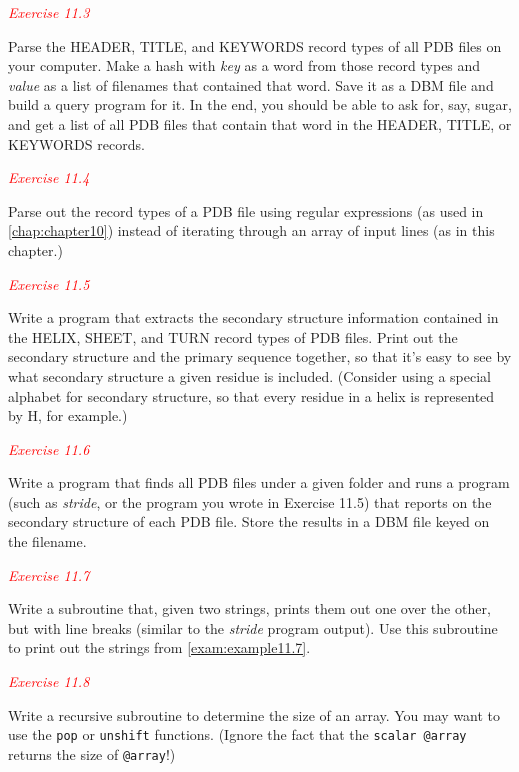 \textcolor{red}{\textit{Exercise 11.3}}
\begin{adjustwidth}{1cm}{}
Parse the HEADER, TITLE, and KEYWORDS record types of all PDB files on your computer. Make a hash with \textit{key} as a word from those record types and \textit{value} as a list of filenames that contained that word. Save it as a DBM file and build a query program for it. In the end, you should be able to ask for, say, sugar, and get a list of all PDB files that contain that word in the HEADER, TITLE, or KEYWORDS records.
\end{adjustwidth}

\textcolor{red}{\textit{Exercise 11.4}}
\begin{adjustwidth}{1cm}{}
Parse out the record types of a PDB file using regular expressions (as used in \autoref{chap:chapter10}) instead of iterating through an array of input lines (as in this chapter.) 
\end{adjustwidth}

\textcolor{red}{\textit{Exercise 11.5}}
\begin{adjustwidth}{1cm}{}
Write a program that extracts the secondary structure information contained in the HELIX, SHEET, and TURN record types of PDB files. Print out the secondary structure and the primary sequence together, so that it's easy to see by what secondary structure a given residue is included. (Consider using a special alphabet for secondary structure, so that every residue in a helix is represented by H, for example.)
\end{adjustwidth}

\textcolor{red}{\textit{Exercise 11.6}}
\begin{adjustwidth}{1cm}{}
Write a program that finds all PDB files under a given folder and runs a program (such as \textit{stride}, or the program you wrote in Exercise 11.5) that reports on the secondary structure of each PDB file. Store the results in a DBM file keyed on the filename.
\end{adjustwidth}

\textcolor{red}{\textit{Exercise 11.7}}
\begin{adjustwidth}{1cm}{}
Write a subroutine that, given two strings, prints them out one over the other, but with line breaks (similar to the \textit{stride} program output). Use this subroutine to print out the strings from \autoref{exam:example11.7}. 
\end{adjustwidth}

\textcolor{red}{\textit{Exercise 11.8}}
\begin{adjustwidth}{1cm}{}
Write a recursive subroutine to determine the size of an array. You may want to use the \verb|pop| or \verb|unshift| functions. (Ignore the fact that the \verb|scalar @array| returns the size of \verb|@array|!)
\end{adjustwidth}

